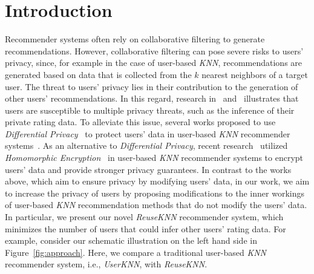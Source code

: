 \documentclass[manuscript,review,anonymous]{acmart}
\begin{document}


\maketitle

\section{Introduction}
Recommender systems often rely on collaborative filtering to generate recommendations.
However, collaborative filtering can pose severe risks to users' privacy, since, for example in the case of user-based \emph{KNN}, recommendations are generated based on data that is collected from the $k$ nearest neighbors of a target user.
The threat to users' privacy lies in their contribution to the generation of other users' recommendations.
In this regard, research in~\cite{ramakrishnan2001being} and~\cite{calandrino2011you} illustrates that users are susceptible to multiple privacy threats, such as the inference of their private rating data. 
To alleviate this issue, several works proposed to use \emph{Differential Privacy}~\cite{dwork2014algorithmic} to protect users' data in user-based \emph{KNN} recommender systems~\cite{zhu2014effective,lu2015security}.
As an alternative to \emph{Differential Privacy}, recent research~\cite{badsha2017privacy,zhang2021privacy} utilized \emph{Homomorphic Encryption}~\cite{gentry2009fully} in user-based \emph{KNN} recommender systems to encrypt users' data and provide stronger privacy guarantees. 
In contrast to the works above, which aim to ensure privacy by modifying users' data, in our work, we aim to increase the privacy of users by proposing modifications to the inner workings 
of user-based \emph{KNN} recommendation methods that do not modify the users' data. 
In particular, we present our novel \emph{ReuseKNN} recommender system, which minimizes the number of users that could infer other users' rating data.
For example, consider our schematic illustration on the left hand side in Figure~\ref{fig:approach}.
Here, we compare a traditional user-based \emph{KNN} recommender system, i.e., \emph{UserKNN}, with \emph{ReuseKNN}.
\end{document}
